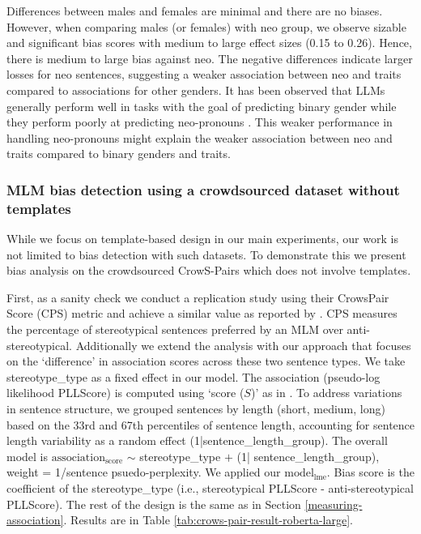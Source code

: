 Differences between males and females are minimal and there are no biases.  
%
However, when comparing males (or females) with neo group, we observe sizable and significant bias scores with medium to large effect sizes (0.15 to 0.26). Hence, there is medium to large bias against neo.
%
The negative differences indicate larger losses for neo sentences, suggesting a weaker association between neo and traits compared to associations for other genders. 
It has been observed that LLMs generally perform well in tasks with the goal of predicting binary gender while they perform poorly at predicting neo-pronouns \cite{ovalle-etal-2024-tokenization,hossain-etal-2023-misgendered}. This weaker performance in handling neo-pronouns might explain the weaker association between neo and traits compared to binary genders and traits.


\subsubsection{MLM bias detection using a crowdsourced dataset without templates}\label{crows-pair-eval}
%
\noindent While we focus on template-based design in our main experiments, our work is not limited to bias detection with such datasets. To demonstrate this we present bias analysis on the crowdsourced CrowS-Pairs \cite{nangia-etal-2020-crows} which does not involve templates. 

First, as a sanity check we conduct a replication study using their CrowsPair Score (CPS) metric and achieve a similar value as reported by \citet{kaneko2022unmasking}. 
%
CPS measures the percentage of stereotypical sentences preferred by an MLM over anti-stereotypical. Additionally we extend the analysis with our approach that focuses on the `difference' in association scores across these two sentence types.
We take stereotype\_type as a fixed effect in our model. The association (pseudo-log likelihood PLLScore) is computed using `score ($S$)' as  in \citet{nangia-etal-2020-crows}.
%
To address variations in sentence structure, we grouped sentences by length (short, medium, long) based on the 33rd and 67th percentiles of sentence length, accounting for sentence length variability as a random effect (1|sentence\_length\_group). The overall model is 
$\text{association}_{\text{score}}$ $\sim$ stereotype\_type $+$ (1| sentence\_length\_group), weight = 1/sentence psuedo-perplexity.
%
We applied our $\text{model}_{\text{lme}}$. 
Bias score is the coefficient of the stereotype\_type (i.e., stereotypical PLLScore - anti-stereotypical PLLScore). The rest of the design is the same as in Section \ref{measuring-association}. 
%
Results are in Table \ref{tab:crows-pair-result-roberta-large}. 


